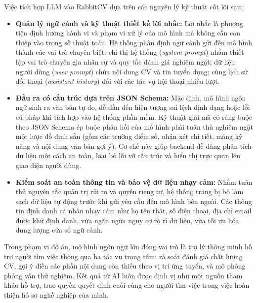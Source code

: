 Việc tích hợp LLM vào RabbitCV dựa trên các nguyên lý kỹ thuật cốt lõi sau:

\begin{itemize}
    \item \textbf{Quản lý ngữ cảnh và kỹ thuật thiết kế lời nhắc:} Lời nhắc là phương tiện định hướng hành vi và phạm vi xử lý của mô hình mà không cần can thiệp vào trọng số thuật toán. Hệ thống phân định ngữ cảnh gửi đến mô hình thành các vai trò chuyên biệt: chỉ thị hệ thống (\textit{system prompt}) nhằm thiết lập vai trò chuyên gia nhân sự và quy tắc đánh giá nghiêm ngặt; dữ liệu người dùng (\textit{user prompt}) chứa nội dung CV và tin tuyển dụng; cùng lịch sử đối thoại (\textit{assistant history}) đối với các tác vụ hội thoại nhiều lượt.
    \item \textbf{Đầu ra có cấu trúc dựa trên JSON Schema:} Mặc định, mô hình ngôn ngữ sinh ra văn bản tự do, dễ dẫn đến hiện tượng sai lệch định dạng hoặc lỗi cú pháp khi tích hợp vào hệ thống phần mềm. Kỹ thuật giải mã có ràng buộc theo JSON Schema ép buộc phản hồi của mô hình phải tuân thủ nghiêm ngặt một lược đồ định sẵn (gồm các trường điểm số, nhận xét chi tiết, mảng kỹ năng và nội dung văn bản gợi ý). Cơ chế này giúp backend dễ dàng phân tích dữ liệu một cách an toàn, loại bỏ lỗi vỡ cấu trúc và hiển thị trực quan lên giao diện người dùng.
    \item \textbf{Kiểm soát an toàn thông tin và bảo vệ dữ liệu nhạy cảm:} Nhằm tuân thủ nguyên tắc quản trị rủi ro và quyền riêng tư, hệ thống trang bị bộ làm sạch dữ liệu tự động trước khi gửi yêu cầu đến mô hình bên ngoài. Các thông tin định danh cá nhân nhạy cảm như họ tên thật, số điện thoại, địa chỉ email được khử định danh, vừa ngăn ngừa nguy cơ rò rỉ dữ liệu, vừa tối ưu hóa dung lượng cửa sổ ngữ cảnh.
\end{itemize}

Trong phạm vi đồ án, mô hình ngôn ngữ lớn đóng vai trò là trợ lý thông minh hỗ trợ người tìm việc thông qua ba tác vụ trọng tâm: rà soát đánh giá chất lượng CV, gợi ý điền các phần nội dung còn thiếu theo vị trí ứng tuyển, và mô phỏng phỏng vấn thử nghiệm. Kết quả từ AI luôn được định vị như một nguồn tham khảo hỗ trợ, trao quyền quyết định cuối cùng cho người tìm việc trong việc hoàn thiện hồ sơ nghề nghiệp của mình.
